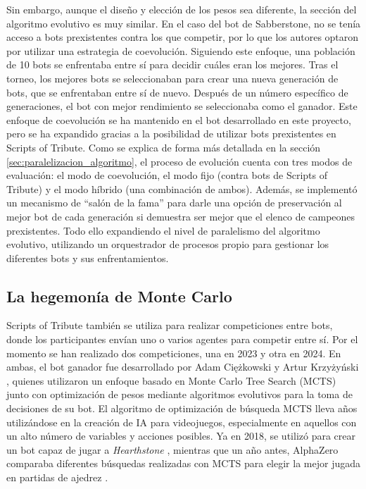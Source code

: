 Sin embargo, aunque el diseño y elección de los pesos sea diferente, la sección del algoritmo evolutivo es muy similar. En el caso del bot de Sabberstone, no se tenía acceso a bots prexistentes contra los que competir, por lo que los autores optaron por utilizar una estrategia de coevolución. Siguiendo este enfoque, una población de 10 bots se enfrentaba entre sí para decidir cuáles eran los mejores. Tras el torneo, los mejores bots se seleccionaban para crear una nueva generación de bots, que se enfrentaban entre sí de nuevo. Después de un número específico de generaciones, el bot con mejor rendimiento se seleccionaba como el ganador. Este enfoque de coevolución se ha mantenido en el bot desarrollado en este proyecto, pero se ha expandido gracias a la posibilidad de utilizar bots prexistentes en Scripts of Tribute. Como se explica de forma más detallada en la sección \ref{sec:paralelizacion_algoritmo}, el proceso de evolución cuenta con tres modos de evaluación: el modo de coevolución, el modo fijo (contra bots de Scripts of Tribute) y el modo híbrido (una combinación de ambos). Además, se implementó un mecanismo de ``salón de la fama'' para darle una opción de preservación al mejor bot de cada generación si demuestra ser mejor que el elenco de campeones prexistentes. Todo ello expandiendo el nivel de paralelismo del algoritmo evolutivo, utilizando un orquestrador de procesos propio para gestionar los diferentes bots y sus enfrentamientos.


\subsection{La hegemonía de Monte Carlo} \label{sec:mcts_cog}

Scripts of Tribute también se utiliza para realizar competiciones entre bots, donde los participantes envían uno o varios agentes para competir entre sí. Por el momento se han realizado dos competiciones, una en 2023 y otra en 2024. En ambas, el bot ganador fue desarrollado por Adam Ciężkowski y Artur Krzyżyński \cite{adam_ciezkowski_developing_2023}, quienes utilizaron un enfoque basado en Monte Carlo Tree Search (MCTS) junto con optimización de pesos mediante algoritmos evolutivos para la toma de decisiones de su bot. El algoritmo de optimización de búsqueda MCTS lleva años utilizándose en la creación de IA para videojuegos, especialmente en aquellos con un alto número de variables y acciones posibles. Ya en 2018, se utilizó para crear un bot capaz de jugar a \textit{Hearthstone} \cite{swiechowski_improving_2018}, mientras que un año antes, AlphaZero comparaba diferentes búsquedas realizadas con MCTS para elegir la mejor jugada en partidas de ajedrez \cite{silver_mastering_2017}.

